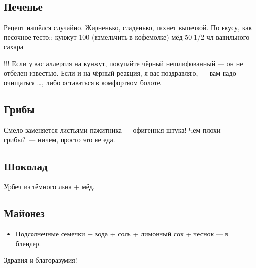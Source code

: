 \subsection{Печенье}

Рецепт нашёлся случайно. Жирненько, сладенько, пахнет выпечкой. По вкусу, как песочное тесто::
кунжут 100 (измельчить в кофемолке)
мёд 50
1/2 чл ванильного сахара

!!! Если у вас аллергия на кунжут, покупайте чёрный нешлифованный — он не отбелен известью. Если и на чёрный реакция, я вас поздравляю, — вам надо очищаться \ldots, либо оставаться в комфортном болоте.

\subsection{Грибы}

Смело заменяется листьями пажитника — офигенная штука! Чем плохи грибы?~--- ничем, просто это не еда.

\subsection{Шоколад}

Урбеч из тёмного льна + мёд.

\subsection{Майонез}
\begin{itemize}
\item Подсолнечные семечки + вода + соль + лимонный сок + чеснок — в блендер.
\end{itemize}

Здравия и благоразумия!



